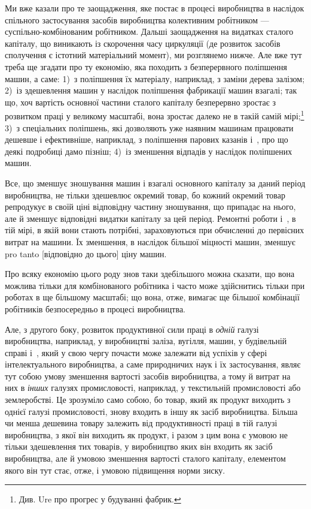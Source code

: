 Ми вже казали про те заощадження, яке постає в процесі
виробництва в наслідок спільного застосування засобів виробництва
колективним робітником — суспільно-комбінованим робітником.
Дальші заощадження на видатках сталого капіталу, що
виникають із скорочення часу циркуляції (де розвиток засобів
сполучення є істотний матеріальний момент), ми розглянемо
нижче. Але вже тут треба ще згадати про ту економію, яка
походить з безперервного поліпшення машин, а саме: 1)~з поліпшення
їх матеріалу, наприклад, з заміни дерева залізом; 2)~із
здешевлення машин у наслідок поліпшення фабрикації машин
взагалі; так що, хоч вартість основної частини сталого капіталу
безперервно зростає з розвитком праці у великому масштабі,
вона зростає далеко не в такій самій мірі;\footnote{
Див. Ure про прогрес у будуванні фабрик.
} 3)~з спеціальних поліпшень,
які дозволяють уже наявним машинам працювати дешевше
і ефективніше, наприклад, з поліпшення парових казанів
і~, про що деякі подробиці дамо пізніш; 4)~із зменшення
відпадів у наслідок поліпшених машин.

Все, що зменшує зношування машин і взагалі основного капіталу
за даний період виробництва, не тільки здешевлює окремий
товар, бо кожний окремий товар репродукує в своїй ціні
відповідну частину зношування, що припадає на нього, але
й зменшує відповідні видатки капіталу за цей період. Ремонтні
роботи і~, в тій мірі, в якій вони стають потрібні, зараховуються
при обчисленні до первісних витрат на машини. Їх зменшення,
в наслідок більшої міцності машин, зменшує pro tanto
[відповідно до цього] ціну машин.

Про всяку економію цього роду знов таки здебільшого можна
сказати, що вона можлива тільки для комбінованого робітника
і часто може здійснитись тільки при роботах в ще більшому
масштабі; що вона, отже, вимагає ще більшої комбінації робітників
безпосередньо в процесі виробництва.

Але, з другого боку, розвиток продуктивної сили праці
в \emph{одній} галузі виробництва, наприклад, у виробництві заліза,
вугілля, машин, у будівельній справі і~, який у свою чергу
почасти може залежати від успіхів у сфері інтелектуального
виробництва, а саме природничих наук і їх застосування, являє
тут собою умову зменшення вартості засобів виробництва, а тому
й витрат на них в \emph{інших} галузях промисловості, наприклад,
у текстильній промисловості або землеробстві. Це зрозуміло
само собою, бо товар, який як продукт виходить з однієї галузі
промисловості, знову входить в іншу як засіб виробництва.
Більша чи менша дешевина товару залежить від продуктивності
праці в тій галузі виробництва, з якої він виходить як продукт,
і разом з цим вона є умовою не тільки здешевлення тих товарів,
у виробництво яких він входить як засіб виробництва, але
й умовою зменшення вартості сталого капіталу, елементом якого
він тут стає, отже, і умовою підвищення норми зиску.


